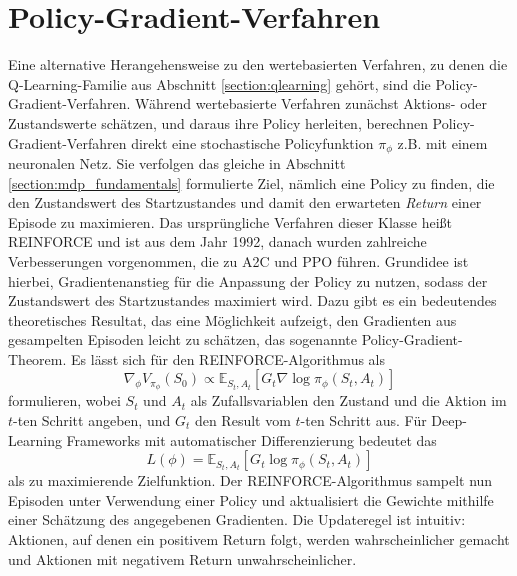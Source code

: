 \section{Policy-Gradient-Verfahren}
Eine alternative Herangehensweise zu den wertebasierten Verfahren, zu denen die Q-Learning-Familie aus Abschnitt \ref{section:qlearning} gehört, sind die Policy-Gradient-Verfahren.
Während wertebasierte Verfahren zunächst Aktions- oder Zustandswerte schätzen, und daraus ihre Policy herleiten, berechnen Policy-Gradient-Verfahren direkt eine stochastische Policyfunktion $\pi_\phi$ z.B. mit einem neuronalen Netz.
Sie verfolgen das gleiche in Abschnitt \ref{section:mdp_fundamentals} formulierte Ziel, nämlich eine Policy zu finden, die den Zustandswert des Startzustandes und damit den erwarteten \textit{Return} einer Episode zu maximieren.
Das ursprüngliche Verfahren dieser Klasse heißt REINFORCE \cite{10.1007/BF00992696} und ist aus dem Jahr 1992, danach wurden zahlreiche Verbesserungen vorgenommen, die zu A2C und PPO führen.
Grundidee ist hierbei, Gradientenanstieg für die Anpassung der Policy zu nutzen, sodass der Zustandswert des Startzustandes maximiert wird.
Dazu gibt es ein bedeutendes theoretisches Resultat, das eine Möglichkeit aufzeigt, den Gradienten aus gesampelten Episoden leicht zu schätzen, das sogenannte Policy-Gradient-Theorem.
Es lässt sich für den REINFORCE-Algorithmus als
\begin{equation}
	\nabla_\phi V_{\pi_\phi}(S_0) \propto \mathbb{E}_{S_t, A_t}\left[G_t \nabla\log{\pi_\phi(S_t, A_t)}\right]
\end{equation}
formulieren, wobei $S_t$ und $A_t$ als Zufallsvariablen den Zustand und die Aktion im $t$-ten Schritt angeben, und $G_t$ den Result vom $t$-ten Schritt aus.
Für Deep-Learning Frameworks mit automatischer Differenzierung bedeutet das
\begin{equation}
	L(\phi) = \mathbb{E}_{S_t, A_t}\left[G_t \log{\pi_\phi(S_t, A_t)}\right]
\end{equation}
als zu maximierende Zielfunktion.
Der REINFORCE-Algorithmus sampelt nun Episoden unter Verwendung einer Policy und aktualisiert die Gewichte mithilfe einer Schätzung des angegebenen Gradienten.
Die Updateregel ist intuitiv: Aktionen, auf denen ein positivem Return folgt, werden wahrscheinlicher gemacht und Aktionen mit negativem Return unwahrscheinlicher.

